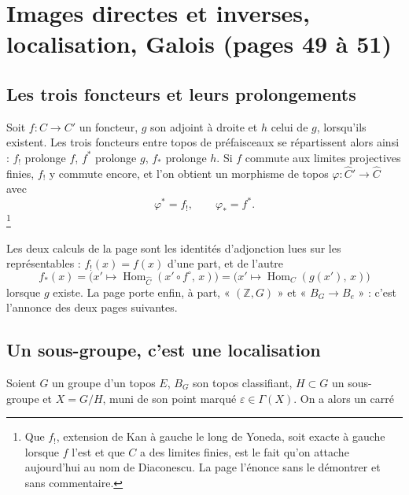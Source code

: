 \documentclass[11pt,a4paper]{article}
\begin{document}
\section*{Images directes et inverses, localisation, Galois (pages 49 à 51)}

\subsection*{Les trois foncteurs et leurs prolongements}

Soit $f : C \to C'$ un foncteur, $g$ son adjoint à droite et $h$ celui de $g$,
lorsqu'ils existent. Les trois foncteurs entre topos de préfaisceaux se
répartissent alors ainsi : $f_{!}$ prolonge $f$, $f^{*}$ prolonge $g$, $f_{*}$
prolonge $h$. Si $f$ commute aux limites projectives finies, $f_{!}$ y commute
encore, et l'on obtient un morphisme de topos $\varphi : \widehat{C}' \to
\widehat{C}$ avec
\[
\varphi^{*} = f_{!}, \qquad \varphi_{*} = f^{*}.
\]
\footnote{Que $f_{!}$, extension de Kan à gauche le long de Yoneda, soit exacte
à gauche lorsque $f$ l'est et que $C$ a des limites finies, est le fait qu'on
attache aujourd'hui au nom de Diaconescu. La page l'énonce sans le démontrer et
sans commentaire.}

Les deux calculs de la page sont les identités d'adjonction lues sur les
représentables : $f_{!}(x) = f(x)$ d'une part, et de l'autre
\[
f_{*}(x) = \bigl(x' \longmapsto \operatorname{Hom}_{\widehat{C}}
(x' \circ f^{\circ},\, x)\bigr)
= \bigl(x' \longmapsto \operatorname{Hom}_{C}(g(x'),\, x)\bigr)
\]
lorsque $g$ existe. La page porte enfin, à part, « $(\mathbb{Z}, G)$ » et
« $B_{G} \to B_{e}$ » : c'est l'annonce des deux pages suivantes.

\subsection*{Un sous-groupe, c'est une localisation}

Soient $G$ un groupe d'un topos
$E$, $B_{G}$ son topos classifiant, $H \subset G$ un sous-groupe et
$X = G/H$, muni de son point marqué $\varepsilon \in \Gamma(X)$. On a alors un
carré

\end{document}

